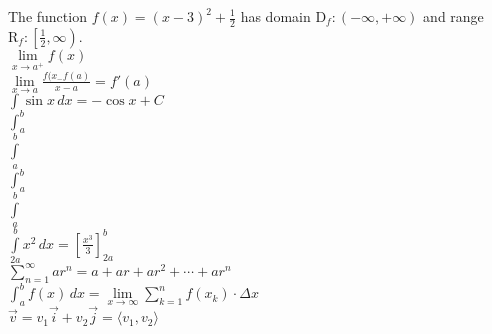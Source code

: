 \documentclass[12pt]{article}
\begin{document}
The function $f(x)=(x-3)^2 +\frac{1}{2}$ has domain $\mathrm{D}_f:(-\infty,+\infty)$ and range $\mathrm{R}_f:\left[ \frac{1}{2},\infty \right)$. \\

$\lim \limits_{x\to a^+}f(x)$ \\
$\displaystyle{\lim \limits_{x \to a}\frac{f(x_-f(a)}{x-a}=f'(a)}$\\

$\displaystyle{\int \sin x \,dx=-\cos x+C}$\\

$\int_a^b$\\
$\int \limits_a^b$\\
$\displaystyle{\int_a^b}$\\
$\displaystyle{\int \limits_a^b}$\\
$\displaystyle{\int \limits_{2a}^{b}x^2 \,dx=\left[       \frac{x^3}{3}       \right]_{2a}^{b}}$\\

$\displaystyle{\sum \limits_{n=1}^{\infty}ar^n=a+ar+ar^2+\cdots+ar^n}$\\

$\displaystyle{\int_a^b f(x) \,dx=\lim\limits_{x \to \infty} \sum \limits_{k=1}^n f(x_k) \cdot \Delta x}$\\

$\vec{v}=v_1 \vec{i} + v_2 \vec{j}= \langle v_1, v_2 \rangle$
\end{document}
